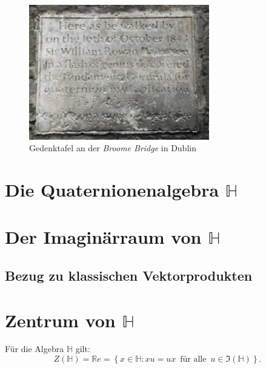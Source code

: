 \documentclass[aspectratio=169]{beamer}
\newcommand{\Ham}{\ensuremath{\mathbb{H}}{ }}
\newcommand{\R}{\ensuremath{\mathbb{R}}{ }}
\begin{document}
    \begin{frame}
        \begin{figure}
            \includegraphics[width=0.7\textwidth]{broome_bridge.jpg}
            \caption{Gedenktafel an der \textit{Broome Bridge} in Dublin \cite{broome_bridge}}
        \end{figure}
    \end{frame}

    \section{Die Quaternionenalgebra \(\mathbb{H}\)}

    \section{Der Imaginärraum von \(\mathbb{H}\)}
    \subsection{Bezug zu klassischen Vektorprodukten}

    \section{Zentrum von \(\mathbb{H}\)}
    \begin{frame}
        \begin{theorem}
            Für die Algebra \Ham gilt:
            \[
                Z \left( \Ham \right) = \R e = \left\{ x \in \Ham \colon xu = ux \,\text{ für alle }\, u \in \Im \left( \Ham \right) \right\}
            .\]
        \end{theorem}
    \end{frame}
\end{document}
